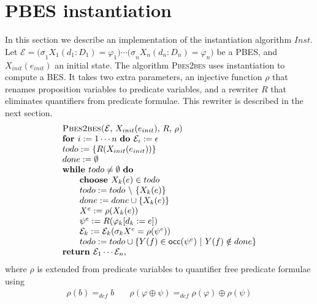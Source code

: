 \documentclass{article}
\begin{document}
\section{PBES instantiation}

In this section we describe an implementation of the instantiation algorithm
$Inst$. Let $\mathcal{E=(\sigma }_{1}X_{1}(d_{1}:D_{1})=\varphi _{1})\cdots
\mathcal{(\sigma }_{n}X_{n}(d_{n}:D_{n})=\varphi _{n})$ be a PBES, and $%
X_{init}(e_{init})$ an initial state. The algorithm \textsc{Pbes2bes} uses
instantiation to compute a BES. It takes two extra parameters, an injective
function $\rho $ that renames proposition variables to predicate variables,
and a rewriter $R$ that eliminates quantifiers from predicate formulae. This
rewriter is described in the next section.%
\begin{equation*}
\begin{array}{l}
\text{\textsc{Pbes2bes(}}\mathcal{E}\text{, }X_{init}(e_{init})\text{, }R%
\text{, }\rho \text{\textsc{)}} \\
\text{\textbf{for }}i:=1\cdots n\text{ \textbf{do }}\mathcal{E}_{i}:=\epsilon
\\
todo:=\{R(X_{init}(e_{init}))\} \\
done:=\emptyset \\
\text{\textbf{while }}todo\neq \emptyset \text{ \textbf{do}} \\
\qquad \text{\textbf{choose }}X_{k}(e)\in todo \\
\qquad todo:=todo\ \backslash \ \{X_{k}(e)\} \\
\qquad done:=done\cup \{X_{k}(e)\} \\
\qquad X^{e}:=\rho (X_{k}(e)) \\
\qquad \psi ^{e}:=R(\varphi _{k}[d_{k}:=e]) \\
\qquad \mathcal{E}_{k}:=\mathcal{E}_{k}(\mathcal{\sigma }_{k}X^{e}=\rho
(\psi ^{e})) \\
\qquad todo:=todo\cup \{Y(f)\in \mathsf{occ}(\psi ^{e})\ |\ Y(f)\notin done\}
\\
\text{\textbf{return }}\mathcal{E}_{1}\cdots \mathcal{E}_{n},%
\end{array}%
\end{equation*}%
where $\rho $ is extended from predicate variables to quantifier free
predicate formulae using%
\begin{equation*}
\begin{array}{cc}
\rho (b)=_{def}b & \quad \rho (\varphi \oplus \psi )=_{def}\rho (\varphi
)\oplus \rho (\psi )%
\end{array}%
\end{equation*}
\end{document}
